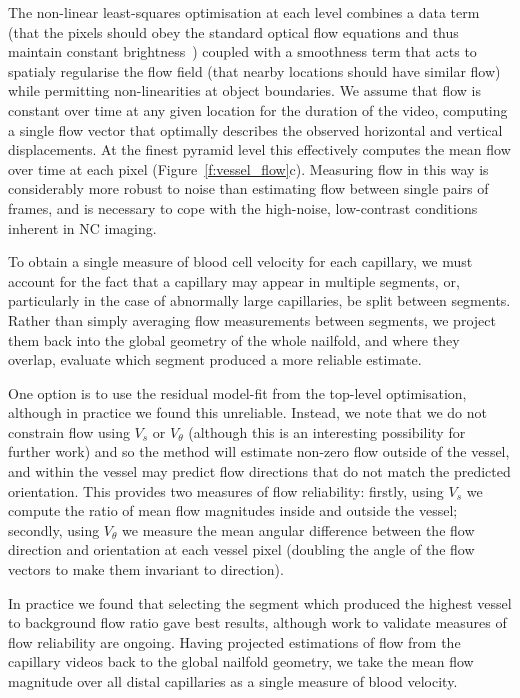 \documentclass[runningheads,a4paper]{llncs}
\newcommand{\fref}[1]{Figure~\ref{#1}}
\newcommand{\sref}[1]{Section~\ref{#1}}
\def\eg{e.g.}
\begin{document}
The non-linear least-squares optimisation at each level combines a data term (that the pixels should obey the standard optical flow equations and thus maintain constant brightness~\cite{Horn_Schunk_AI81}) coupled with a smoothness term that acts to spatialy regularise the flow field (that nearby locations should have similar flow) while permitting non-linearities at object boundaries. We assume that flow is constant over time at any given location for the duration of the video, computing a single flow vector that optimally describes the observed horizontal and vertical displacements. At the finest pyramid level this effectively computes the mean flow over time at each pixel (\fref{f:vessel_flow}c). Measuring flow in this way is considerably more robust to noise than estimating flow between single pairs of frames, and is necessary to cope with the high-noise, low-contrast conditions inherent in NC imaging. 

To obtain a single measure of blood cell velocity for each capillary, we must account for the fact that a capillary may appear in multiple segments, or, particularly in the case of abnormally large capillaries, be split between segments. Rather than simply averaging flow measurements between segments, we project them back into the global geometry of the whole nailfold, and where they overlap, evaluate which segment produced a more reliable estimate. 

One option is to use the residual model-fit from the top-level optimisation, although in practice we found this unreliable. Instead, we note that we do not constrain flow using $V_s$ or $V_\theta$ (although this is an interesting possibility for further work) and so the method will estimate non-zero flow outside of the vessel, and within the vessel may predict flow directions that do not match the predicted orientation. This provides two measures of flow reliability: firstly, using $V_s$ we compute the ratio of mean flow magnitudes inside and outside the vessel; secondly, using $V_\theta$ we measure the mean angular difference between the flow direction and orientation at each vessel pixel (doubling the angle of the flow vectors to make them invariant to direction).

In practice we found that selecting the segment which produced the highest vessel to background flow ratio gave best results, although work to validate measures of flow reliability are ongoing. Having projected estimations of flow from the capillary videos back to the global nailfold geometry, we take the mean flow magnitude over all distal capillaries as a single measure of blood velocity. %
%
\end{document}
